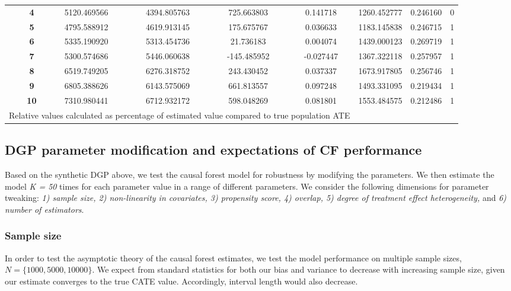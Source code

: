 \documentclass[12pt]{article}
\begin{document}
\begin{table}
{\begin{tabular}{lc|ccccccc}
\addlinespace
&\textbf{4} &5120.469566 & 4394.805763 & 725.663803 & 0.141718 & 1260.452777 & 0.246160 & 0 \\
\addlinespace
&\textbf{5} & 4795.588912 & 4619.913145 & 175.675767 & 0.036633 & 1183.145838 & 0.246715 & 1 \\
\addlinespace
&\textbf{6} & 5335.190920 & 5313.454736 & 21.736183 & 0.004074 & 1439.000123 & 0.269719 & 1 \\
\addlinespace
&\textbf{7} & 5300.574686 & 5446.060638 & -145.485952 & -0.027447 & 1367.322118 & 0.257957 & 1 \\\addlinespace
&\textbf{8} &6519.749205 & 6276.318752 & 243.430452 & 0.037337 & 1673.917805 & 0.256746 & 1 \\\addlinespace
&\textbf{9} & 6805.388626 & 6143.575069 & 661.813557 & 0.097248 & 1493.331095 & 0.219434 & 1 \\
\addlinespace
&\textbf{10} & 7310.980441 & 6712.932172 & 598.048269 & 0.081801 & 1553.484575 & 0.212486 & 1\\
\bottomrule
\multicolumn{6}{p{\textwidth}}{\footnotesize Relative values calculated as percentage of estimated value compared to true population ATE}\\
\end{tabular}}
\end{table}




\subsection{DGP parameter modification and expectations of CF performance}

Based on the synthetic DGP above, we test the causal forest model for robustness by modifying the parameters. We then estimate the model \textit{K = 50} times for each parameter value in a range of different parameters. We consider the following dimensions for parameter tweaking: \textit{1) sample size, 2) non-linearity in covariates, 3) propensity score, 4) overlap, 5) degree of treatment effect heterogeneity,} and \textit{6) number of estimators}. 
\subsubsection{Sample size} 
In order to test the asymptotic theory of the causal forest estimates, we test the model performance on multiple sample sizes, $ N = \{1000, 5000, 10000\}$. We expect from standard statistics for both our bias and variance to decrease with increasing sample size, given our estimate converges to the true CATE value. Accordingly, interval length would also decrease.
\end{document}
